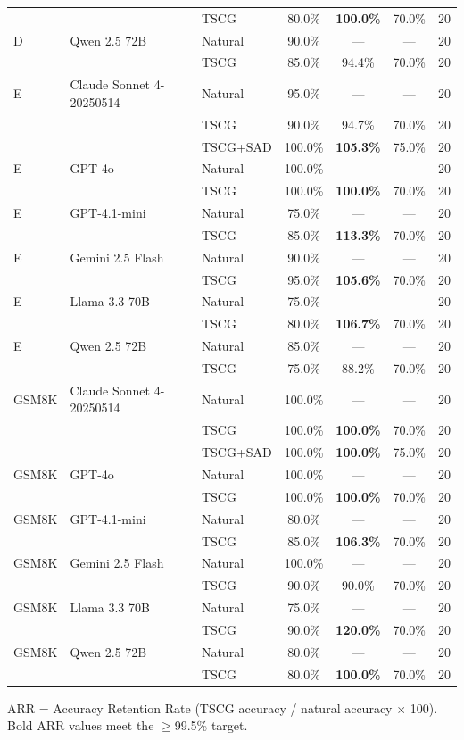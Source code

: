 \begin{table}[htbp]
\begin{tabular}{lllcccr}
    & & TSCG & 80.0\% & \textbf{100.0\%} & 70.0\% & 20 \\
    D & Qwen 2.5 72B & Natural & 90.0\% & --- & --- & 20 \\
    & & TSCG & 85.0\% & 94.4\% & 70.0\% & 20 \\
    \addlinespace
    E & Claude Sonnet 4-20250514 & Natural & 95.0\% & --- & --- & 20 \\
    & & TSCG & 90.0\% & 94.7\% & 70.0\% & 20 \\
    & & TSCG+SAD & 100.0\% & \textbf{105.3\%} & 75.0\% & 20 \\
    E & GPT-4o & Natural & 100.0\% & --- & --- & 20 \\
    & & TSCG & 100.0\% & \textbf{100.0\%} & 70.0\% & 20 \\
    E & GPT-4.1-mini & Natural & 75.0\% & --- & --- & 20 \\
    & & TSCG & 85.0\% & \textbf{113.3\%} & 70.0\% & 20 \\
    E & Gemini 2.5 Flash & Natural & 90.0\% & --- & --- & 20 \\
    & & TSCG & 95.0\% & \textbf{105.6\%} & 70.0\% & 20 \\
    E & Llama 3.3 70B & Natural & 75.0\% & --- & --- & 20 \\
    & & TSCG & 80.0\% & \textbf{106.7\%} & 70.0\% & 20 \\
    E & Qwen 2.5 72B & Natural & 85.0\% & --- & --- & 20 \\
    & & TSCG & 75.0\% & 88.2\% & 70.0\% & 20 \\
    \addlinespace
    GSM8K & Claude Sonnet 4-20250514 & Natural & 100.0\% & --- & --- & 20 \\
    & & TSCG & 100.0\% & \textbf{100.0\%} & 70.0\% & 20 \\
    & & TSCG+SAD & 100.0\% & \textbf{100.0\%} & 75.0\% & 20 \\
    GSM8K & GPT-4o & Natural & 100.0\% & --- & --- & 20 \\
    & & TSCG & 100.0\% & \textbf{100.0\%} & 70.0\% & 20 \\
    GSM8K & GPT-4.1-mini & Natural & 80.0\% & --- & --- & 20 \\
    & & TSCG & 85.0\% & \textbf{106.3\%} & 70.0\% & 20 \\
    GSM8K & Gemini 2.5 Flash & Natural & 100.0\% & --- & --- & 20 \\
    & & TSCG & 90.0\% & 90.0\% & 70.0\% & 20 \\
    GSM8K & Llama 3.3 70B & Natural & 75.0\% & --- & --- & 20 \\
    & & TSCG & 90.0\% & \textbf{120.0\%} & 70.0\% & 20 \\
    GSM8K & Qwen 2.5 72B & Natural & 80.0\% & --- & --- & 20 \\
    & & TSCG & 80.0\% & \textbf{100.0\%} & 70.0\% & 20 \\
    \bottomrule
  \end{tabular}
  \vspace{2mm}
  \footnotesize{ARR = Accuracy Retention Rate (TSCG accuracy / natural accuracy $\times$ 100). Bold ARR values meet the $\geq$99.5\% target.}
\end{table}



